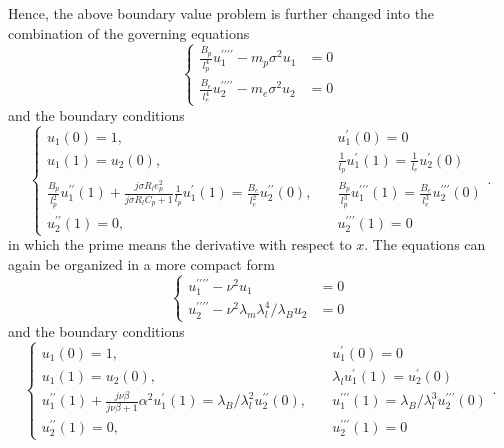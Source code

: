 \documentclass{elsarticle}
\begin{document}
Hence, the above boundary value problem is further changed into the combination of the governing equations
\begin{equation}
    \left\{\begin{aligned}
        \frac{B_p}{l_p^4} u_1^{\prime\prime\prime\prime} - m_p \sigma^2 u_1 &= 0 \\
        \frac{B_e}{l_e^4} u_2^{\prime\prime\prime\prime} - m_e \sigma^2 u_2 &= 0 
    \end{aligned}\right.
    \label{eq:eq_balance_equations_nondim}
\end{equation}
and the boundary conditions
\begin{equation}
    \left\{\begin{aligned}
        u_1(0) = 1 , &\quad u_1^\prime(0) = 0 \\
        u_1(1) = u_2(0), &\quad \frac{1}{l_p} u_1^\prime(1) = \frac{1}{l_e} u_2^\prime(0) \\
        \frac{B_p}{l_p^2} u_1^{\prime\prime}(1) + \frac{j \sigma R_l e_p^2}{j \sigma R_l C_p + 1} \frac{1}{l_p} u_1^{\prime}(1) = \frac{B_e}{l_e^2} u_2^{\prime\prime}(0) , &\quad \frac{B_p}{l_p^3} u_1^{\prime\prime\prime}(1) = \frac{B_e}{l_e^3} u_2^{\prime\prime\prime}(0) \\
        u_2^{\prime\prime}(1) = 0 , &\quad u_2^{\prime\prime\prime}(1) = 0
    \end{aligned}\right..
    \label{eq:eq_boundary_conditions_nondim}
\end{equation}
in which the prime means the derivative with respect to $x$. The equations can again be organized in a more compact form
\begin{equation}
    \left\{\begin{aligned}
         u_1^{\prime\prime\prime\prime} - \nu^2 u_1 &= 0 \\
         u_2^{\prime\prime\prime\prime} - \nu^2 \lambda_m \lambda_l^4 / \lambda_B u_2 &= 0 
    \end{aligned}\right.
    \label{eq:eq_balance_equations_compact}
\end{equation}
and the boundary conditions
\begin{equation}
    \left\{\begin{aligned}
        u_1(0) = 1 , &\quad u_1^\prime(0) = 0 \\
        u_1(1) = u_2(0), &\quad \lambda_l u_1^\prime(1) = u_2^\prime(0) \\
        u_1^{\prime\prime}(1) + \frac{ j \nu \beta }{ j \nu \beta + 1 } \alpha^2 u_1^{\prime}(1) = \lambda_B/ \lambda_l^2 u_2^{\prime\prime}(0) , &\quad u_1^{\prime\prime\prime}(1) = \lambda_B/ \lambda_l^3 u_2^{\prime\prime\prime}(0) \\
        u_2^{\prime\prime}(1) = 0 , &\quad u_2^{\prime\prime\prime}(1) = 0
    \end{aligned}\right..
    \label{eq:eq_boundary_conditions_compact}
\end{equation}
\end{document}
